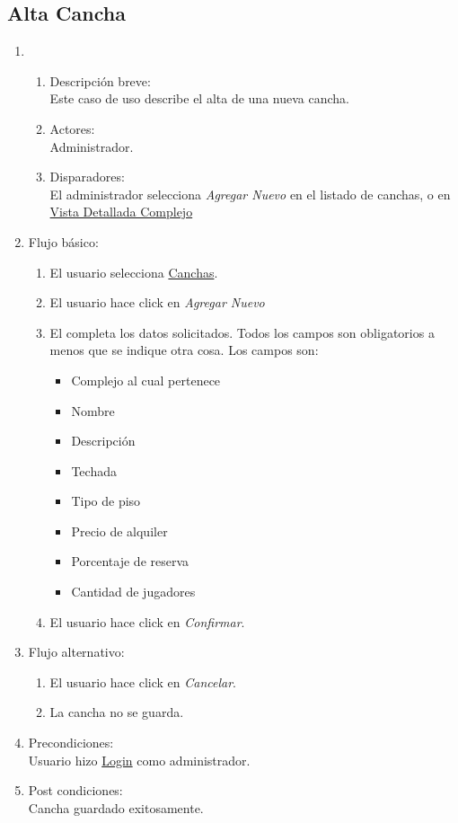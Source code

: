 \documentclass[a4paper,11pt]{article}
\begin{document}
\subsection{Alta Cancha}
\begin{enumerate}

    \item
    \begin{enumerate}
    \item Descripci\'on breve: \\
        Este caso de uso describe el alta de una nueva cancha.
    \item Actores: \\
        Administrador.
    \item Disparadores: \\
        El administrador selecciona \emph{Agregar Nuevo} en el listado de canchas, o en \underline{Vista Detallada Complejo}
    \end{enumerate} 
    \item Flujo b\'asico:
		\begin{enumerate}
        		\item El usuario selecciona \underline{Canchas}.
                        \item El usuario hace click en \emph{Agregar Nuevo}
			\item El completa los datos solicitados. Todos los campos son obligatorios a menos que se indique otra cosa. Los campos son: 
			\begin{itemize}
				 \item Complejo al cual pertenece
				 \item Nombre
				 \item Descripci\'on
				 \item Techada
				 \item Tipo de piso
				 \item Precio de alquiler
		                 \item Porcentaje de reserva
				 \item Cantidad de jugadores
			\end{itemize}
                        \item El usuario hace click en \emph{Confirmar}.
                \end{enumerate}
	\item Flujo alternativo:
		\begin{enumerate}
		 \item El usuario hace click en \emph{Cancelar}.
		 \item La cancha no se guarda.
		\end{enumerate}

    \item Precondiciones: \\
        Usuario hizo \underline{Login} como administrador.

    \item Post condiciones: \\
        Cancha guardado exitosamente.

\end{enumerate}
\end{document}

